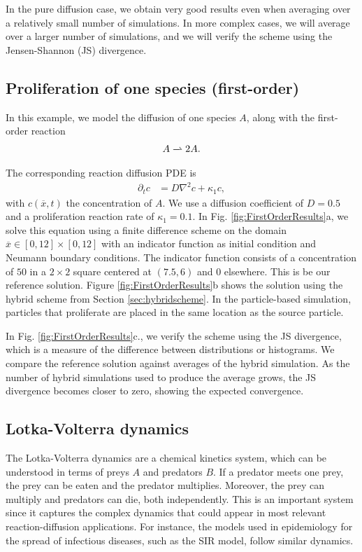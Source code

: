 \documentclass[10pt,twocolumn]{revtex4-1}
\begin{document}
	In the pure diffusion case, we obtain very good results even when averaging over a relatively small number of simulations. In more complex cases, we will average over a larger number of simulations, and we will verify the scheme using the Jensen-Shannon (JS) divergence. 
	
	\subsection{Proliferation of one species (first-order)}
	In this example, we model the diffusion of one species $A$, along with the first-order reaction 
	\begin{align*}
	A\xrightharpoonup[]{}2A.
	\end{align*}
	
	The corresponding reaction diffusion PDE is
	\begin{align}
	\partial_{t}c&=D\nabla^2 c+\kappa_1c, 
	\label{ProlifPDE}
	\end{align}
	with $c(\overline{x},t)$ the concentration of $A$. We use a diffusion coefficient of $D=0.5$ and a proliferation reaction rate of $\kappa_1=0.1$. In Fig. \ref{fig:FirstOrderResults}a, we solve this equation using a finite difference scheme on the domain $\overline{x}\in[0,12]\times[0,12]$ with an indicator function as initial condition and Neumann boundary conditions. The indicator function consists of a concentration of $50$ in a $2\times 2$ square centered at $(7.5,6)$ and $0$ elsewhere. This is be our reference solution. Figure \ref{fig:FirstOrderResults}b shows the solution using the hybrid scheme from Section \ref{sec:hybridscheme}. In the particle-based simulation, particles that proliferate are placed in the same location as the source particle.
	
	In Fig. \ref{fig:FirstOrderResults}c., we verify the scheme using the JS divergence, which is a measure of the difference between distributions or histograms. We compare the reference solution against averages of the hybrid simulation. As the number of hybrid simulations used to produce the average grows, the JS divergence becomes closer to zero, showing the expected convergence. 
	
	\subsection{Lotka-Volterra dynamics} \label{sec:ex1LV}
	The Lotka-Volterra dynamics are a chemical kinetics system, which can be understood in terms of preys $A$ and predators $B$. If a predator meets one prey, the prey can be eaten and the predator multiplies. Moreover, the prey can multiply and predators can die, both independently. This is an important system since it captures the complex dynamics that could appear in most relevant reaction-diffusion applications. For instance, the models used in epidemiology for the spread of infectious diseases, such as the SIR model, follow similar dynamics.
	
\end{document}
